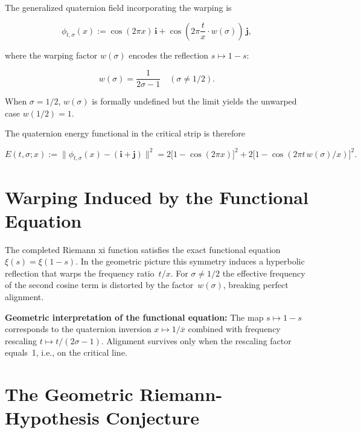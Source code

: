 \documentclass[12pt,a4paper]{article}
\newcommand{\ii}{\mathbf{i}}
\newcommand{\jj}{\mathbf{j}}
\begin{document}
The generalized quaternion field incorporating the warping is

\begin{mathblock}
\[
\phi_{t,\sigma}(x) := \cos(2\pi x)\,\ii + \cos\!\left(2\pi \frac{t}{x} \cdot w(\sigma)\right)\,\jj,
\]
\end{mathblock}

\noindent where the warping factor $w(\sigma)$ encodes the reflection $s \mapsto 1-s$:

\begin{mathblock}
\[
w(\sigma) = \frac{1}{2\sigma-1} \quad (\sigma \neq 1/2).
\]
\end{mathblock}

\noindent When $\sigma = 1/2$, $w(\sigma)$ is formally undefined but the limit yields the unwarped case $w(1/2) = 1$.

The quaternion energy functional in the critical strip is therefore

\begin{mathblock}
\[
E(t,\sigma;x) := \bigl\| \phi_{t,\sigma}(x) - (\ii + \jj) \bigr\|^2
= 2\bigl[1 - \cos(2\pi x)\bigr]^2 + 2\bigl[1 - \cos(2\pi t\, w(\sigma)/x)\bigr]^2.
\]
\end{mathblock}

\section{Warping Induced by the Functional Equation}
\label{sec:functional-equation}

The completed Riemann xi function satisfies the exact functional equation $\xi(s) = \xi(1-s)$. In the geometric picture this symmetry induces a hyperbolic reflection that warps the frequency ratio~$t/x$. For $\sigma \neq 1/2$ the effective frequency of the second cosine term is distorted by the factor~$w(\sigma)$, breaking perfect alignment.

\begin{keypoint}
\textbf{Geometric interpretation of the functional equation:}
The map $s \mapsto 1-s$ corresponds to the quaternion inversion $x \mapsto 1/\overline{x}$ combined with frequency rescaling $t \mapsto t/(2\sigma-1)$. Alignment survives only when the rescaling factor equals~1, i.e., on the critical line.
\end{keypoint}

\section{The Geometric Riemann-Hypothesis Conjecture}
\label{sec:conjecture}
\end{document}
